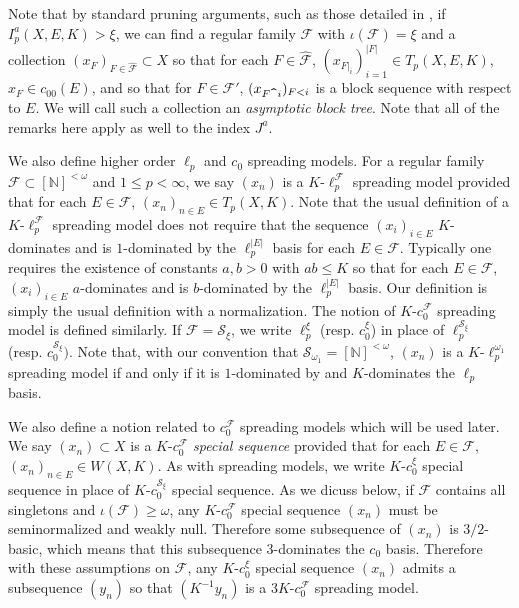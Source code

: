 \documentclass[12pt]{amsart}
\theoremstyle{definition}
\newcommand{\fin}{[\mathbb{N}]^{<\omega}}
\newcommand{\fff}{\mathcal{F}}
\newcommand{\sss}{\mathcal{S}}
\begin{document}
Note that by standard pruning arguments, such as those detailed in \cite{AJO}, if $I^a_p(X, E, K)>\xi$, we can find a regular family $\fff$ with $\iota(\fff)=\xi$ and a collection $(x_F)_{F\in \widehat{\fff}}\subset X$ so that for each $F\in \widehat{\fff}$, $(x_{F|_i})_{i=1}^{|F|}\in T_p(X,E,K)$, $x_F\in c_{00}(E)$, and so that for $F\in \fff'$, $(x_{F\verb!^!i})_{F<i}$ is a block sequence with respect to $E$. We will call such a collection an \emph{asymptotic block tree}. Note that all of the remarks here apply as well to the index $J^a$.  



We also define higher order $\ell_p$ and $c_0$ spreading models.  For a regular family $\fff\subset \fin$ and $1\leqslant p<\infty$, we say $(x_n)$ is a $K$-$\ell_p^\fff$ spreading model provided that for each $E\in \fff$, $(x_n)_{n\in E}\in T_p(X,K)$. Note that the usual definition of a $K$-$\ell_p^\fff$ spreading model does not require that the sequence $(x_i)_{i\in E}$ $K$-dominates and is $1$-dominated by the $\ell_p^{|E|}$ basis for each $E\in \fff$.  Typically one requires the existence of constants $a,b>0$ with $ab\leqslant K$ so that for each $E\in \fff$, $(x_i)_{i\in E}$ $a$-dominates and is $b$-dominated by the $\ell_p^{|E|}$ basis.  Our definition is simply the usual definition with a normalization. The notion of $K$-$c_0^\fff$ spreading model is defined similarly.  If $\fff=\sss_\xi$, we write $\ell_p^\xi$ (resp. $c_0^\xi$) in place of $\ell_p^{\sss_\xi}$ (resp. $c_0^{\sss_\xi})$.  Note that, with our convention that $\sss_{\omega_1}=\fin$, $(x_n)$ is a $K$-$\ell_p^{\omega_1}$ spreading model if and only if it is $1$-dominated by and $K$-dominates the $\ell_p$ basis.  


We also define a notion related to $c_0^\fff$ spreading models which will be used later.  We say $(x_n)\subset X$ is a $K$-$c_0^\fff$ \emph{special sequence} provided that for each $E\in \fff$, $(x_n)_{n\in E}\in W(X, K)$.  As with spreading models, we write $K$-$c_0^\xi$ special sequence in place of $K$-$c_0^{\sss_\xi}$ special sequence.  As we dicuss below, if $\fff$ contains all singletons and $\iota(\fff)\geqslant \omega$, any $K$-$c_0^\fff$ special sequence $(x_n)$ must be seminormalized and weakly null.  Therefore some subsequence of $(x_n)$ is $3/2$-basic, which means that this subsequence $3$-dominates the $c_0$ basis.  Therefore with these assumptions on $\fff$, any $K$-$c_0^\xi$ special sequence $(x_n)$ admits a subsequence $(y_n)$ so that $(K^{-1}y_n)$ is a $3K$-$c_0^\fff$ spreading model.  
\end{document}
